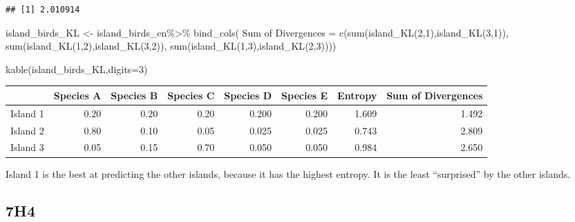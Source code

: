\documentclass[
]{book}
\newenvironment{Shaded}{\begin{snugshade}}{\end{snugshade}}
\newcommand{\AttributeTok}[1]{\textcolor[rgb]{0.77,0.63,0.00}{#1}}
\newcommand{\DecValTok}[1]{\textcolor[rgb]{0.00,0.00,0.81}{#1}}
\newcommand{\FunctionTok}[1]{\textcolor[rgb]{0.00,0.00,0.00}{#1}}
\newcommand{\NormalTok}[1]{#1}
\newcommand{\OtherTok}[1]{\textcolor[rgb]{0.56,0.35,0.01}{#1}}
\newcommand{\SpecialCharTok}[1]{\textcolor[rgb]{0.00,0.00,0.00}{#1}}
\newcommand{\StringTok}[1]{\textcolor[rgb]{0.31,0.60,0.02}{#1}}
\begin{document}
\begin{verbatim}
## [1] 2.010914
\end{verbatim}

\begin{Shaded}
\begin{Highlighting}[]
\NormalTok{island\_birds\_KL }\OtherTok{\textless{}{-}}\NormalTok{ island\_birds\_en}\SpecialCharTok{\%\textgreater{}\%} \FunctionTok{bind\_cols}\NormalTok{( }\StringTok{\textasciigrave{}}\AttributeTok{Sum of Divergences}\StringTok{\textasciigrave{}} \OtherTok{=} \FunctionTok{c}\NormalTok{(}\FunctionTok{sum}\NormalTok{(}\FunctionTok{island\_KL}\NormalTok{(}\DecValTok{2}\NormalTok{,}\DecValTok{1}\NormalTok{),}\FunctionTok{island\_KL}\NormalTok{(}\DecValTok{3}\NormalTok{,}\DecValTok{1}\NormalTok{)),}
                                                    \FunctionTok{sum}\NormalTok{(}\FunctionTok{island\_KL}\NormalTok{(}\DecValTok{1}\NormalTok{,}\DecValTok{2}\NormalTok{),}\FunctionTok{island\_KL}\NormalTok{(}\DecValTok{3}\NormalTok{,}\DecValTok{2}\NormalTok{)),}
                                                    \FunctionTok{sum}\NormalTok{(}\FunctionTok{island\_KL}\NormalTok{(}\DecValTok{1}\NormalTok{,}\DecValTok{3}\NormalTok{),}\FunctionTok{island\_KL}\NormalTok{(}\DecValTok{2}\NormalTok{,}\DecValTok{3}\NormalTok{))))}

\FunctionTok{kable}\NormalTok{(island\_birds\_KL,}\AttributeTok{digits=}\DecValTok{3}\NormalTok{)}
\end{Highlighting}
\end{Shaded}

\begin{tabular}{l|r|r|r|r|r|r|r}
\hline
  & Species A & Species B & Species C & Species D & Species E & Entropy & Sum of Divergences\\
\hline
Island 1 & 0.20 & 0.20 & 0.20 & 0.200 & 0.200 & 1.609 & 1.492\\
\hline
Island 2 & 0.80 & 0.10 & 0.05 & 0.025 & 0.025 & 0.743 & 2.809\\
\hline
Island 3 & 0.05 & 0.15 & 0.70 & 0.050 & 0.050 & 0.984 & 2.650\\
\hline
\end{tabular}

Island 1 is the best at predicting the other islands, because it has the highest entropy. It is the least ``surprised'' by the other islands.

\hypertarget{h4-3}{%
\subsection*{7H4}\label{h4-3}}
\end{document}
